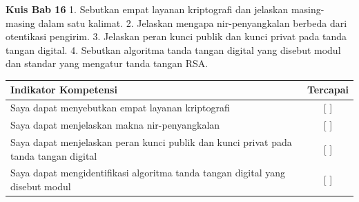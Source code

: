 \begin{obeassessment}
\textbf{Kuis Bab 16}
1. Sebutkan empat layanan kriptografi dan jelaskan masing-masing dalam satu
   kalimat.
2. Jelaskan mengapa nir-penyangkalan berbeda dari otentikasi pengirim.
3. Jelaskan peran kunci publik dan kunci privat pada tanda tangan digital.
4. Sebutkan algoritma tanda tangan digital yang disebut modul dan standar yang
   mengatur tanda tangan RSA.
\end{obeassessment}
\begin{competencychecklist}
\begin{tabularx}{\linewidth}{|X|c|}
\hline
Indikator Kompetensi & Tercapai \\
\hline
Saya dapat menyebutkan empat layanan kriptografi & [ ] \\
\hline
Saya dapat menjelaskan makna nir-penyangkalan & [ ] \\
\hline
Saya dapat menjelaskan peran kunci publik dan kunci privat pada tanda tangan digital & [ ] \\
\hline
Saya dapat mengidentifikasi algoritma tanda tangan digital yang disebut modul & [ ] \\
\hline
\end{tabularx}
\end{competencychecklist}
